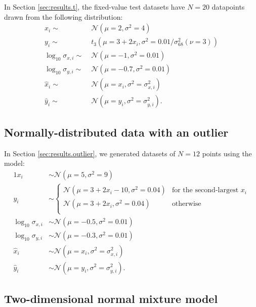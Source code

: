 \documentclass[fleqn,usenatbib]{rasti}
\begin{document}
In Section \ref{sec:results.t}, the fixed-value test datasets have $N = 20$
datapoints drawn from the following distribution:
\begin{align}
    x_i \sim&\; \mathcal N (\mu = 2, \sigma^2 = 4) \\
    y_i \sim&\; t_{3} (\mu = 3 + 2 x_i, \sigma^2 = 0.01 / \sigma_{68}^2(\nu = 3)) \\
    \log_{10} \sigma_{x, i} \sim&\; \mathcal N (\mu = -1, \sigma^2 = 0.01) \\
    \log_{10} \sigma_{y, i} \sim&\; \mathcal N (\mu = -0.7, \sigma^2 = 0.01) \\
    \hat{x}_i \sim&\; \mathcal N (\mu = x_i, \sigma^2 = \sigma_{x, i}^2) \\
    \hat{y}_i \sim&\; \mathcal N (\mu = y_i, \sigma^2 = \sigma_{y, i}^2).
\end{align}

\subsection{Normally-distributed data with an outlier}
\label{sec:data-models.outlier}

In Section \ref{sec:results.outlier}, we generated datasets of $N = 12$ points
using the model:
\begin{alignat}{1}
    x_i& \sim \mathcal N (\mu = 5, \sigma^2 = 9) \\
    y_i& \sim
    \begin{cases}
        \mathcal N (\mu = 3 + 2 x_i - 10, \sigma^2 = 0.04) &
            \text{for the second-largest $x_i$} \\
        \mathcal N (\mu = 3 + 2 x_i, \sigma^2 = 0.04) &
            \text{otherwise} \\
    \end{cases}\\
    \log_{10} \sigma_{x, i}& \sim \mathcal N (\mu = -0.5, \sigma^2 = 0.01) \\
    \log_{10} \sigma_{y, i}& \sim \mathcal N (\mu = -0.3, \sigma^2 = 0.01) \\
    \hat{x}_i& \sim \mathcal N (\mu = x_i, \sigma^2 = \sigma_{x, i}^2) \\
    \hat{y}_i& \sim \mathcal N (\mu = y_i, \sigma^2 = \sigma_{y, i}^2).
\end{alignat}

\subsection{Two-dimensional normal mixture model}
\label{sec:data-models.gmm}
\end{document}
